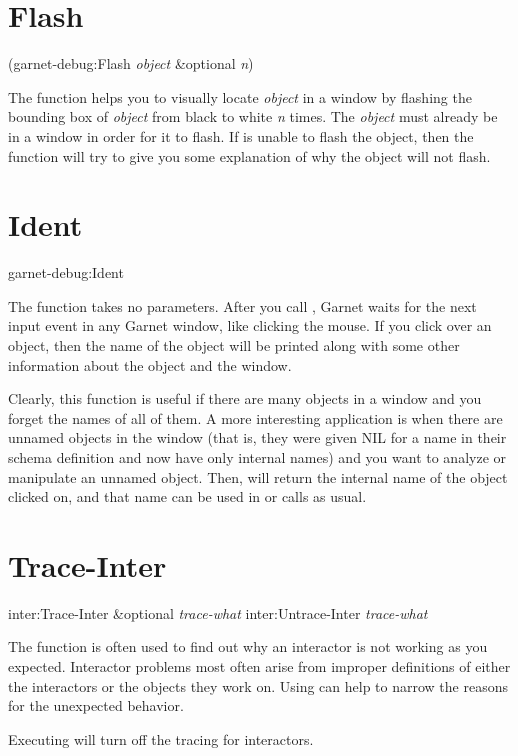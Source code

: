 \section{Flash}

\begin{programexample}
  (garnet-debug:Flash {\it object} \&optional {\it n})
\end{programexample}

The function 
helps you to visually locate {\it object} in a window by flashing the bounding
box of {\it object} from black to white {\it n} times.  The {\it object} must
already be in a window in order for it to flash.  If  is unable
to flash the object, then the function will try to give you some explanation
of why the object will not flash.


\section{Ident}

\begin{programexample}
garnet-debug:Ident
\end{programexample}

The function  takes no parameters.  After you call ,
Garnet waits for the next input event in any Garnet window,
like clicking the mouse.  If you click
over an object, then the name of the object will be printed along with
some other information about the object and the window.

Clearly, this function is useful if there are many objects in a window
and you forget the names of all of them.  A more interesting application is
when there are unnamed objects in the window (that is, they were given
NIL for a name in their schema definition and now have only internal names)
and you want to analyze or manipulate an unnamed object.  Then, 
will return the internal name of the object clicked on, and that name can
be used in  or  calls as usual.


\section{Trace-Inter}
\label{trace-inter}

\begin{programexample}
inter:Trace-Inter \&optional {\it trace-what} 
inter:Untrace-Inter {\it trace-what} 
\end{programexample}

The function  is often used to find out why an
interactor is not working
as you expected.  Interactor problems most often arise from improper
definitions of either the interactors or the objects they work on.
Using  can help to narrow the reasons for the unexpected
behavior.

Executing  will turn off the tracing for interactors.



